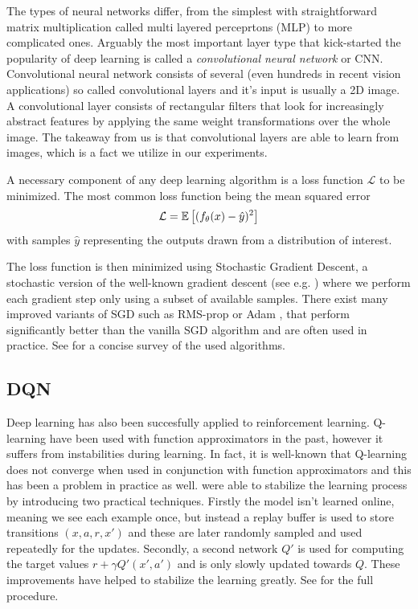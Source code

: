The types of neural networks differ, from the simplest with straightforward matrix multiplication called multi layered perceprtons (MLP) to more complicated ones. Arguably the most important layer type that kick-started the popularity of deep learning is called a \textit{convolutional neural network} or CNN. Convolutional neural network consists of several (even hundreds in recent vision applications) so called convolutional layers and it's input is usually a 2D image. A convolutional layer consists of rectangular filters that look for increasingly abstract features by applying the same weight transformations over the whole image. The takeaway from us is that convolutional layers are able to learn from images, which is a fact we utilize in our experiments.

A necessary component of any deep learning algorithm is a loss function $\mathcal{L}$ to be minimized. The most common loss function being the mean squared error
\begin{equation*}
\mathcal{L} = \mathbb{E}\left[ {(f_\theta(x) - \hat{y})^2} \right]
\end{equation*}
with samples $\hat{y}$ representing the outputs drawn from a distribution of interest. 

The loss function is then minimized using Stochastic Gradient Descent, a stochastic version of the well-known gradient descent (see e.g. \citet{boyd2004convex}) where we perform each gradient step only using a subset of available samples. 
There exist many improved variants of SGD such as RMS-prop \cite{tieleman2012lecture} or Adam \citep{kingma2014adam}, that perform significantly better than the vanilla SGD algorithm and are often used in practice. See \citet{ruder2016overview} for a concise survey of the used algorithms.


\subsection{DQN}

Deep learning has also been succesfully applied to reinforcement learning. Q-learning have been used with function approximators in the past, however it suffers from instabilities during learning. In fact, it is well-known that Q-learning does not converge when used in conjunction with function approximators \citep{baird1995residual, sutton1998reinforcement} and this has been a problem in practice as well. \citet{mnih2015human} were able to stabilize the learning process by introducing two practical techniques. Firstly the model isn't learned online, meaning we see each example once, but instead a replay buffer is used to store transitions $(x, a, r, x')$ and these are later randomly sampled and used repeatedly for the updates. Secondly, a second network $Q'$ is used for computing the target values $r + \gamma Q'(x', a')$ and is only slowly updated towards $Q$. These improvements have helped to stabilize the learning greatly. See  for the full procedure.

